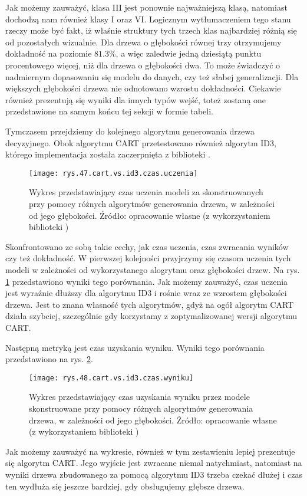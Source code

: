 Jak możemy zauważyć, klasa III jest ponownie najważniejszą klasą, natomiast dochodzą nam również klasy I oraz VI. Logicznym wytłumaczeniem tego stanu rzeczy może być fakt, iż właśnie struktury tych trzech klas najbardziej różnią się od pozostałych wizualnie. Dla drzewa o głębokości równej trzy otrzymujemy dokładność na poziomie $81.3\%$, a więc zaledwie jedną dziesiątą punktu procentowego więcej, niż dla drzewa o głębokości dwa. To może świadczyć o nadmiernym dopasowaniu się modelu do danych, czy też słabej generalizacji. Dla większych głębokości drzewa nie odnotowano wzrostu dokładności. Ciekawie również prezentują się wyniki dla innych typów wejść, toteż zostaną one przedstawione na samym końcu tej sekcji w formie tabeli. 

Tymczasem przejdziemy do kolejnego algorytmu generowania drzewa decyzyjnego. Obok algorytmu CART przetestowano również algorytm ID3, którego implementacja została zaczerpnięta z biblioteki . 
\begin{figure}[h]
    \centering
    \texttt{[image: rys.47.cart.vs.id3.czas.uczenia]}
    \caption{Wykres przedstawiający czas uczenia modeli za skonstruowanych przy pomocy różnych algorytmów generowania drzewa, w zależności od jego głębokości. Źródło: opracowanie własne (z wykorzystaniem biblioteki )}
    \label{rys.47.cart.vs.id3.czas.uczenia}
\end{figure}
Skonfrontowano ze sobą takie cechy, jak czas uczenia, czas zwracania wyników czy też dokładność. W pierwszej kolejności przyjrzymy się czasom uczenia tych modeli w zależności od wykorzystanego alogrytmu oraz głębokości drzew. Na rys. \ref{rys.47.cart.vs.id3.czas.uczenia} przedstawiono wyniki tego porównania.
Jak możemy zauważyć, czas uczenia jest wyraźnie dłuższy dla algorytmu ID3 i rośnie wraz ze wzrostem głębokości drzewa. Jest to znana własność tych algorytmów, gdyż na ogół algorytm CART działa szybciej, szczególnie gdy korzystamy z zoptymalizowanej wersji algorytmu CART. 

Następną metryką jest czas uzyskania wyniku. Wyniki tego porównania przedstawiono na rys. \ref{rys.48.cart.vs.id3.czas.wyniku}. 
\begin{figure}[h]
    \centering
    \texttt{[image: rys.48.cart.vs.id3.czas.wyniku]}
    \caption{Wykres przedstawiający czas uzyskania wyniku przez modele skonstruowane przy pomocy różnych algorytmów generowania drzewa, w zależności od jego głębokości. Źródło: opracowanie własne (z wykorzystaniem biblioteki )}
    \label{rys.48.cart.vs.id3.czas.wyniku}
\end{figure}
Jak możemy zauważyć na wykresie, również w tym zestawieniu lepiej prezentuje się algorytm CART. Jego wyjście jest zwracane niemal natychmiast, natomiast na wyniki drzewa zbudowanego za pomocą algorytmu ID3 trzeba czekać dłużej i czas ten wydłuża się jeszcze bardziej, gdy obsługujemy głębsze drzewa. 

